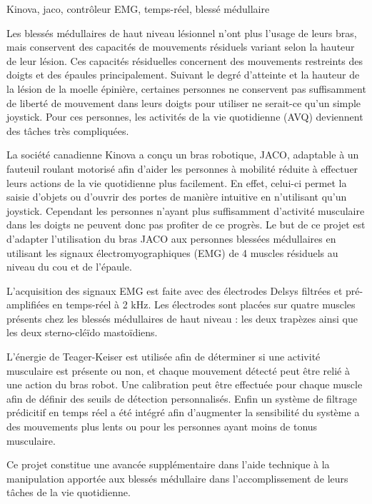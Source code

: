 \documentclass[letterpaper, twoside, 12pt, memoire, creativecommons, hyperref]{thETS}
\begin{document}
\begin{sommaire}{Kinova, jaco, contrôleur EMG, temps-réel, blessé médullaire}

Les blessés médullaires de haut niveau lésionnel n’ont plus l’usage de leurs bras, mais conservent des capacités de mouvements résiduels variant selon la hauteur de leur lésion. Ces capacités résiduelles concernent des mouvements restreints des doigts et des épaules principalement. Suivant le degré d’atteinte et la hauteur de la lésion de la moelle épinière, certaines personnes ne conservent pas suffisamment de liberté de mouvement dans leurs doigts pour utiliser ne serait-ce qu’un simple joystick. Pour ces personnes, les activités de la vie quotidienne (AVQ) deviennent des tâches très compliquées. 

La société canadienne Kinova a conçu un bras robotique, JACO, adaptable à un fauteuil roulant motorisé afin d’aider les personnes à mobilité réduite à effectuer leurs actions de la vie quotidienne plus facilement. En effet, celui-ci permet la saisie d’objets ou d’ouvrir des portes de manière intuitive en n’utilisant qu’un joystick. Cependant les personnes n’ayant plus suffisamment d’activité musculaire dans les doigts ne peuvent donc pas profiter de ce progrès. Le but de ce projet est d’adapter l’utilisation du bras JACO aux personnes blessées médullaires en utilisant les signaux électromyographiques (EMG) de 4 muscles résiduels au niveau du cou et de l’épaule. 

L’acquisition des signaux EMG est faite avec des électrodes Delsys filtrées et pré-amplifiées en temps-réel à 2 kHz. Les électrodes sont placées sur quatre muscles présents chez les blessés médullaires de haut niveau : les deux trapèzes ainsi que les deux sterno-cléïdo mastoïdiens. 

L’énergie de Teager-Keiser est utilisée afin de déterminer si une activité musculaire est présente ou non, et chaque mouvement détecté peut être relié à une action du bras robot. Une calibration peut être effectuée pour chaque muscle afin de définir des seuils de détection personnalisés. Enfin un système de filtrage prédicitif en temps réel a été intégré afin d’augmenter la sensibilité du système a des mouvements plus lents ou pour les personnes ayant moins de tonus musculaire.

Ce projet constitue une avancée supplémentaire dans l’aide technique à la manipulation apportée aux blessés médullaire dans l’accomplissement de leurs tâches de la vie quotidienne. 



\end{sommaire}
\end{document}
